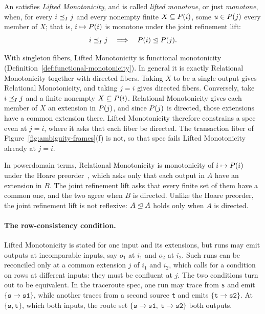 \begin{definition}
\label{def:lifted-monotonicity}
An \spectype satisfies \emph{Lifted Monotonicity}, and
is called \emph{lifted monotone}, or just \emph{monotone}, when, for every $i\preceq_I j$ and every nonempty
finite $X\subseteq P(i)$, some $u\in P(j)$ \outrel every member of $X$;
that is, $i\mapsto P(i)$ is monotone under the joint refinement lift:
        \begin{equation}
  i\preceq_I j
  \quad\Longrightarrow\quad
  P(i)\trianglelefteq P(j).
  \label{eq:lifted-monotonicity}
        \end{equation}
\end{definition}

With singleton fibers, Lifted Monotonicity is functional monotonicity
(Definition~\ref{def:functional-monotonicity}).  In general it is exactly
Relational Monotonicity together with directed fibers.  Taking $X$ to be a
single output gives Relational Monotonicity, and taking $j=i$ gives directed
fibers.  Conversely, take $i\preceq_I j$ and a finite nonempty
$X\subseteq P(i)$.  Relational Monotonicity gives each member of $X$ an extension in $P(j)$, and since $P(j)$ is directed, those extensions have a common extension there.  Lifted Monotonicity therefore constrains a spec
even at $j=i$, where it asks that each fiber be directed.  The transaction
fiber of Figure~\ref{fig:ambiguity-frames}(f) is not, so that spec fails
Lifted Monotonicity already at $j=i$.

In powerdomain terms, Relational Monotonicity is monotonicity of
$i\mapsto P(i)$ under the Hoare preorder~\cite{abramsky1994domain}, which
asks only that each output in $A$ have an extension in $B$.  The joint
refinement lift asks that every finite set of them have a common one, and the
two agree when $B$ is directed.  Unlike the Hoare preorder, the joint
refinement lift is not reflexive: $A\trianglelefteq A$ holds only when $A$ is
directed.

\paragraph{The row-consistency condition.}
Lifted Monotonicity is stated for one input and its extensions, but runs may
emit outputs at incomparable inputs, say $o_1$ at $i_1$ and $o_2$ at $i_2$.
Such runs can be reconciled only at a common extension $j$ of $i_1$ and $i_2$, which calls for a condition on rows at different inputs: they must be confluent at $j$.  The two conditions turn out to be equivalent.
In the traceroute spec, one run may trace from \texttt{s} and emit
$\{\texttt{s}{\to}\texttt{s1}\}$, while another traces from a second source
\texttt{t} and emits $\{\texttt{t}{\to}\texttt{s2}\}$.  At $\{\texttt{s},\texttt{t}\}$, which \inrel both inputs, the route set $\{\texttt{s}{\to}\texttt{s1},\ \texttt{t}{\to}\texttt{s2}\}$ \outrel both outputs.

